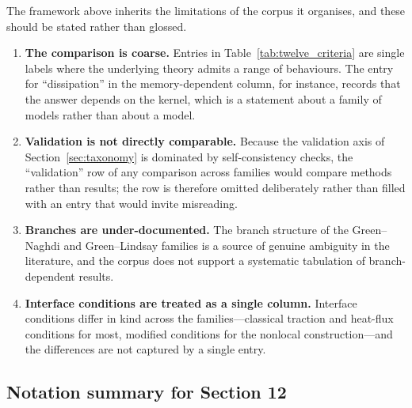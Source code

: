 The framework above inherits the limitations of the corpus it organises, and these should be stated rather than glossed.

\begin{enumerate}
\item \textbf{The comparison is coarse.} Entries in Table~\ref{tab:twelve_criteria} are single labels where the underlying theory admits a range of behaviours. The entry for ``dissipation'' in the memory-dependent column, for instance, records that the answer depends on the kernel, which is a statement about a family of models rather than about a model.
\item \textbf{Validation is not directly comparable.} Because the validation axis of Section~\ref{sec:taxonomy} is dominated by self-consistency checks, the ``validation'' row of any comparison across families would compare methods rather than results; the row is therefore omitted deliberately rather than filled with an entry that would invite misreading.
\item \textbf{Branches are under-documented.} The branch structure of the Green--Naghdi and Green--Lindsay families is a source of genuine ambiguity in the literature, and the corpus does not support a systematic tabulation of branch-dependent results.
\item \textbf{Interface conditions are treated as a single column.} Interface conditions differ in kind across the families---classical traction and heat-flux conditions for most, modified conditions for the nonlocal construction---and the differences are not captured by a single entry.
\end{enumerate}

\subsection{Notation summary for Section 12}

